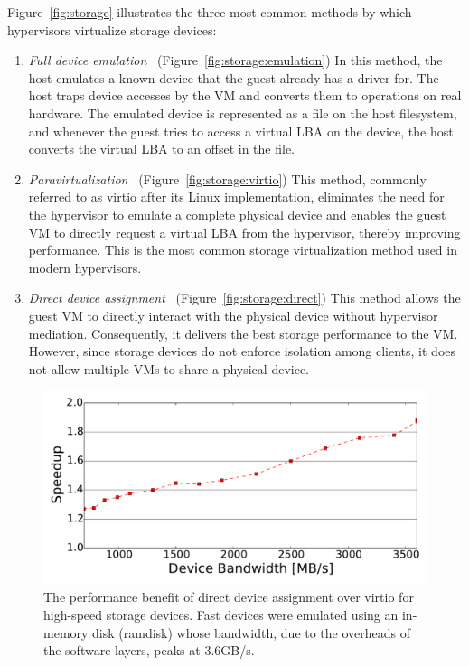 Figure~\ref{fig:storage} illustrates the three most common methods by which hypervisors virtualize storage devices:

\begin{enumerate}
\item
  \emph{Full device emulation}~\cite{sugerman2001virtualizing} (Figure~\ref{fig:storage:emulation})\quad 
  In this method, the host emulates a known device that the guest already has a driver for. The host traps device accesses by the VM and converts them to operations on real hardware. The emulated device is represented as a file on the host filesystem, and whenever the guest tries to access a virtual LBA on the device, the host converts the virtual LBA to an offset in the file.

\item
  \emph{Paravirtualization}~\cite{barham2003xen,russell2008virtio} (Figure~\ref{fig:storage:virtio})\quad
  This method, commonly referred to as virtio after its Linux implementation, eliminates the need for the hypervisor to emulate a complete physical device and enables the guest VM to directly request a virtual LBA from the hypervisor, thereby improving performance. This is the most common storage virtualization method used in modern hypervisors.

\item
  \emph{Direct device assignment}~\cite{raj2007high} (Figure~\ref{fig:storage:direct})\quad
  This method allows the guest VM to directly interact with the physical device without hypervisor mediation. Consequently, it delivers the best storage performance to the VM. However, since storage devices do not enforce isolation among clients, it does not allow multiple VMs to share a physical device.
\end{enumerate}

\begin{figure}[t]
  \centering
  \includegraphics[width=\columnwidth]{figs/motivation.pdf}
  \caption{The performance benefit of direct device assignment over virtio for high-speed storage devices. Fast devices were emulated using an in-memory disk (ramdisk) whose bandwidth, due to the overheads of the software layers, peaks at 3.6GB/s.
    \label{fig:directperf}}
  \end{figure}

